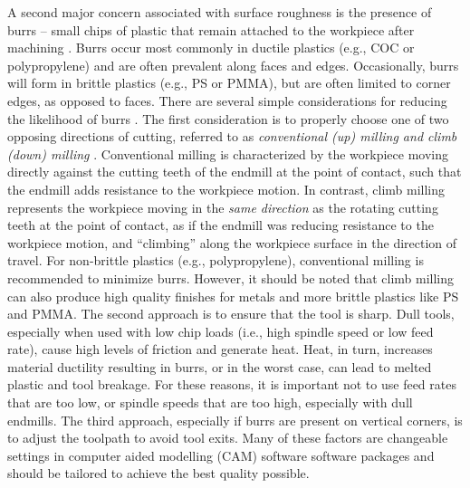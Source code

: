 {A second major concern associated with surface roughness is the presence of burrs – small chips of plastic that remain attached to the workpiece after machining \cite{Lee2005}. Burrs occur most commonly in ductile plastics (e.g., COC or polypropylene) and are often prevalent along faces and edges. Occasionally, burrs will form in brittle plastics (e.g., PS or PMMA), but are often limited to corner edges, as opposed to faces. There are several simple considerations for reducing the likelihood of burrs \cite{Dimov2004}. The first consideration is to properly choose one of two opposing directions of cutting, referred to as \textit{conventional (up) milling and climb (down) milling} \cite{Toh2004}. Conventional milling is characterized by the workpiece moving directly against the cutting teeth of the endmill at the point of contact, such that the endmill adds resistance to the workpiece motion. In contrast, climb milling represents the workpiece moving in the \textit{same direction} as the rotating cutting teeth at the point of contact, as if the endmill was reducing resistance to the workpiece motion, and “climbing” along the workpiece surface in the direction of travel. For non-brittle plastics (e.g., polypropylene), conventional milling is recommended to minimize burrs. However, it should be noted that climb milling can also produce high quality finishes for metals \cite{Bernardos2002} and more brittle plastics like PS and PMMA. The second approach is to ensure that the tool is sharp. Dull tools, especially when used with low chip loads (i.e., high spindle speed or low feed rate), cause high levels of friction and generate heat. Heat, in turn, increases material ductility resulting in burrs, or in the worst case, can lead to melted plastic and tool breakage. For these reasons, it is important not to use feed rates that are too low, or spindle speeds that are too high, especially with dull endmills. The third approach, especially if burrs are present on vertical corners, is to adjust the toolpath to avoid tool exits. Many of these factors are changeable settings in computer aided modelling (CAM) software software packages and should be tailored to achieve the best quality possible.
}
